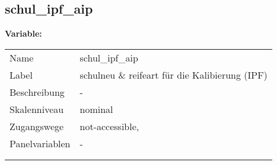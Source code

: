	
	
	\subsection{schul\_ipf\_aip}
	\label{subSection:schul_ipf_aip}

	\noindent\textbf{Variable:}\\
		\begin{tabular}{lL{11.3cm}}
			\label{tableVariable:schul_ipf_aip}
			Name & schul\_ipf\_aip \\
			Label & schulneu \& reifeart für die Kalibierung (IPF) \\
			Beschreibung & - \\
			Skalenniveau & nominal \\
			Zugangswege &
				not-accessible,
 \\
			Panelvariablen & -
			 \\
			 \\
 \\
		\end{tabular}






	
	\newpage
